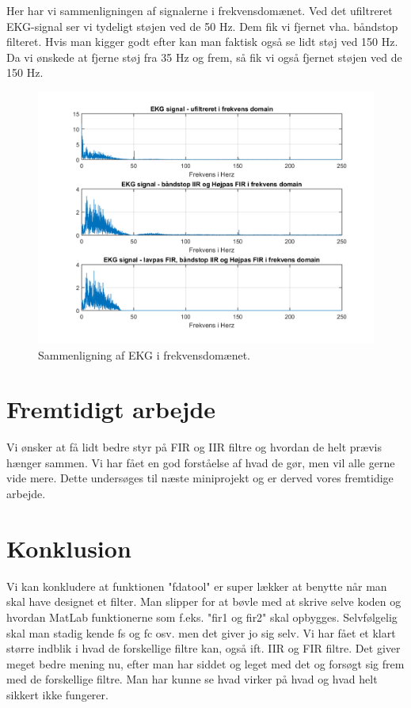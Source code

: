 \documentclass[12pt, letterpaper]{article}
\begin{document}
Her har vi sammenligningen af signalerne i frekvensdomænet. Ved det ufiltreret EKG-signal ser vi tydeligt støjen ved de 50 Hz. Dem fik vi fjernet vha. båndstop filteret. 
Hvis man kigger godt efter kan man faktisk også se lidt støj ved 150 Hz. Da vi ønskede at fjerne støj fra 35 Hz og frem, så fik vi også fjernet støjen ved de 150 Hz. 



\begin{figure}[H]
           \includegraphics[width=\linewidth]{billeder/EKGfrekvensdomain}	   							\caption{Sammenligning af EKG i frekvensdomænet.}
\end{figure}


\section{Fremtidigt arbejde}
Vi ønsker at få lidt bedre styr på FIR og IIR filtre og hvordan de helt prævis hænger sammen. Vi har fået en god forståelse af hvad de gør, men vil alle gerne vide mere. Dette undersøges til næste miniprojekt og er derved vores fremtidige arbejde.

\section{Konklusion}
Vi kan konkludere at funktionen "fdatool" er super lækker at benytte når man skal have designet et filter. Man slipper for at bøvle med at skrive selve koden og hvordan MatLab funktionerne som f.eks. "fir1 og fir2" skal opbygges. Selvfølgelig skal man stadig kende fs og fc osv. men det giver jo sig selv. 
Vi har fået et klart større indblik i hvad de forskellige filtre kan, også ift. IIR og FIR filtre. Det giver meget bedre mening nu, efter man har siddet og leget med det og forsøgt sig frem med de forskellige filtre. Man har kunne se hvad virker på hvad og hvad helt sikkert ikke fungerer. 
\end{document}
